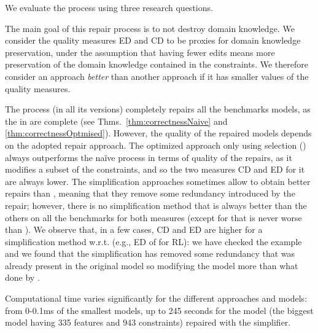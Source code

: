 \begin{tikzborder}{\cite{Gargantini16:validation}}
\begin{tikzborder}{\cite{gargantini_combinatorial_2017}}
\begin{tikzborder}{\cite{garn2019}}
\begin{tikzborder}{\cite{arcaini2019achieving}}
\begin{tikzborder}{\cite{arcaini2019varivolution}}
		We evaluate the process using three research questions.
		
		
		The main goal of this repair process is to not destroy domain knowledge. We consider the quality measures \textsf{ED} and \textsf{CD} to be proxies for domain knowledge preservation, under the assumption that having fewer edits means more preservation of the domain knowledge contained in the constraints. We therefore consider an approach {\it better} than another approach if it has smaller values of the quality measures.
		
		The process (in all its versions) completely repairs all the benchmarks models, as the \fccs in \fccSet are complete (see Thms.~\ref{thm:correctnessNaive} and \ref{thm:correctnessOptmised}). However, the quality of the repaired models depends on the adopted repair approach. The optimized approach only using selection (\onlySelection) always outperforms the na{\"i}ve process in terms of quality of the repairs, as it modifies a subset of the constraints, and so the two measures CD and ED for it are always lower. The simplification approaches sometimes allow to obtain better repairs than \onlySelection, meaning that they remove some redundancy introduced by the repair; however, there is no simplification method that is always better than the others on all the benchmarks for both measures (except for \atgt that is never worse than \espresso). 
		We observe that, in a few cases, CD and ED are higher for a simplification method w.r.t. \onlySelection (e.g., ED of \espresso for \register RL): we have checked the example and we found that the simplification has removed some redundancy that was already present in the original model \m so modifying the model more than what done by \onlySelection.
		
		
		
		Computational time varies significantly for the different approaches and models: from 0-0.1ms of the smallest models, up to 245 seconds for the \windows model (the biggest model having 335 features and 943 constraints) repaired with the \espresso simplifier.
		

\end{tikzborder}
\end{tikzborder}
\end{tikzborder}
\end{tikzborder}
\end{tikzborder}

